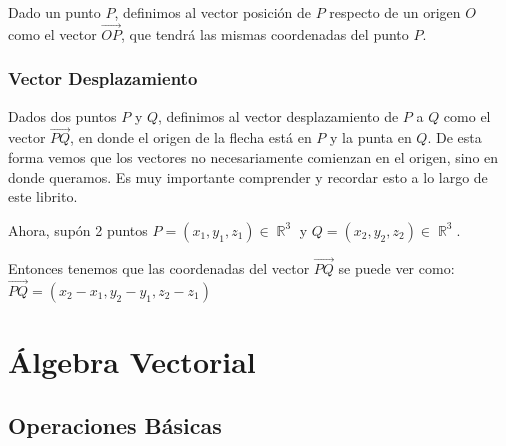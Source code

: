 \documentclass[12pt, fleqn]{report}                             %
\DeclareMathOperator \Reals        {\mathbb{R}}                 %
\newcommand{\lVec}[1]{\overrightarrow{#1}}                      %
\begin{document}
                Dado un punto $P$, definimos al vector posición de $P$ respecto de un origen $O$ como
                el vector $\lVec{OP}$, que tendrá las mismas coordenadas del punto $P$.
            
            \subsection{Vector Desplazamiento}
            
                Dados dos puntos $P$ y $Q$, definimos al vector desplazamiento de $P$ a $Q$ como el
                vector $\lVec{PQ}$, en donde el origen de la flecha está en $P$ y la punta en $Q$.
                De esta forma vemos que los vectores no necesariamente comienzan en el origen,
                sino en donde queramos. Es muy importante comprender y recordar esto a lo largo
                de este librito.

                Ahora, supón 2 puntos $P = (x_1, y_1, z_1) \in \Reals^3$ y $Q = (x_2, y_2, z_2) \in \Reals^3$.

                Entonces tenemos que las coordenadas del vector $\lVec{PQ}$ se puede ver como:\\
                $\lVec{PQ} = (x_2 - x_1, y_2 - y_1, z_2 - z_1)$









    \chapter{Álgebra Vectorial}
            
        

        \clearpage
        \section{Operaciones Básicas}
            
\end{document}
